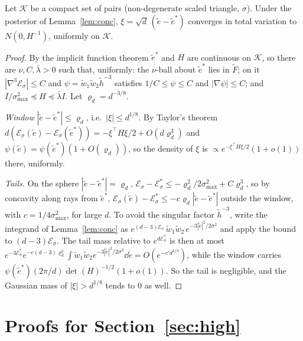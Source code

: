 \begin{lemma}\label{lem:laplace2}
Let $\mathcal K$ be a compact set of pairs (non-degenerate scaled triangle, $\sigma$). Under the posterior of
Lemma~\ref{lem:conc}, $\xi = \sqrt d\,(\tilde e - \tilde e^*)$ converges in total variation to $N(0, H^{-1})$, uniformly on
$\mathcal K$.
\end{lemma}

\begin{proof}
By the implicit function theorem $\tilde e^*$ and $H$ are continuous on $\mathcal K$, so there are $\nu, C, \bar\lambda > 0$ such
that, uniformly: the $\nu$-ball about $\tilde e^*$ lies in $\tilde F$; on it $|\nabla^3\mathcal E_\sigma| \le C$ and
$\psi = \tilde w_1\tilde w_2\tilde h^{-3}$ satisfies $1/C \le \psi \le C$ and $|\nabla\psi| \le C$; and
$I/\sigma_{\max}^2 \preceq H \preceq \bar\lambda I$. Let $\varrho_d = d^{-3/8}$.

\emph{Window} $|\tilde e - \tilde e^*| \le \varrho_d$, i.e.\ $|\xi| \le d^{1/8}$. By Taylor's theorem
$d(\mathcal E_\sigma(\tilde e) - \mathcal E_\sigma(\tilde e^*)) = -\xi^\top H\xi/2 + O(d\varrho_d^3)$ and $\psi(\tilde e) = \psi(\tilde e^*)(1 + O(\varrho_d))$,
so the density of $\xi$ is $\propto e^{-\xi^\top H\xi/2}(1 + o(1))$ there, uniformly.

\emph{Tails.} On the sphere $|\tilde e - \tilde e^*| = \varrho_d$, $\mathcal E_\sigma - \mathcal E_\sigma^* \le -\varrho_d^2/2\sigma_{\max}^2 + C\varrho_d^3$,
so by concavity along rays from $\tilde e^*$, $\mathcal E_\sigma(\tilde e) - \mathcal E_\sigma^* \le -c\varrho_d|\tilde e - \tilde e^*|$ outside the
window, with $c = 1/4\sigma_{\max}^2$, for large $d$. To avoid the singular factor $\tilde h^{-3}$, write the integrand of
Lemma~\ref{lem:conc} as $e^{(d-3)\mathcal E_\sigma}\,\tilde w_1\tilde w_2\,e^{-3|\tilde e|^2/2\sigma^2}$ and apply the bound to
$(d-3)\mathcal E_\sigma$. The tail mass relative to $e^{d\mathcal E_\sigma^*}$ is then at most
$e^{-3\mathcal E_\sigma^*}e^{-c(d-3)\varrho_d^2}\int\tilde w_1\tilde w_2 e^{-3|\tilde e|^2/2\sigma^2}\dd\tilde e = O(e^{-c'd^{1/4}})$, while the
window carries $\psi(\tilde e^*)(2\pi/d)\det(H)^{-1/2}(1 + o(1))$. So the tail is negligible, and the Gaussian mass of
$|\xi| > d^{1/8}$ tends to $0$ as well.
\end{proof}

\section{Proofs for Section~\ref{sec:high}}\label{app:high}

